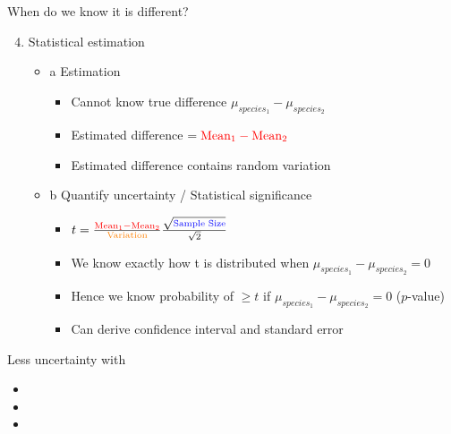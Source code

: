 \documentclass[10pt]{beamer}\usepackage[]{graphicx}\usepackage[]{color}
\begin{document}
\begin{frame}[fragile]{When do we know it is different?}

\begin{enumerate}
  \setcounter{enumi}{3}
  \item Statistical estimation
  \begin{itemize}
    \item a Estimation
      \begin{itemize}
        \item Cannot know true difference $\mu_{species_1} - \mu_{species_2}$
        \item Estimated difference $= \color{red}{\text{Mean}_1 - \text{Mean}_2 }$
        \item Estimated difference contains random variation
      \end{itemize}
    \item b Quantify uncertainty / Statistical significance
      \begin{itemize}
        \item $
      t = \frac{\color{red}{\text{Mean}_1 - \text{Mean}_2}}{\text{\color{orange}Variation}}
      \frac{\sqrt{{\text{\color{blue}{Sample Size}}}}}{\sqrt{2}}
      $
        \item We know exactly how t is distributed when $\mu_{species_1} - \mu_{species_2} = 0$
        \item Hence we know probability of $\geq t$ if $\mu_{species_1} - \mu_{species_2} = 0$ ($p$-value)
        \item Can derive confidence interval and standard error
      \end{itemize}
  \end{itemize}
\end{enumerate}

\pause
Less uncertainty with
  \begin{itemize}
    \item \color{red}{Larger absolute difference}
    \item \color{orange}{Smaller variability}
    \item \color{blue}{Larger sample size}
  \end{itemize}


\end{frame}
\end{document}
